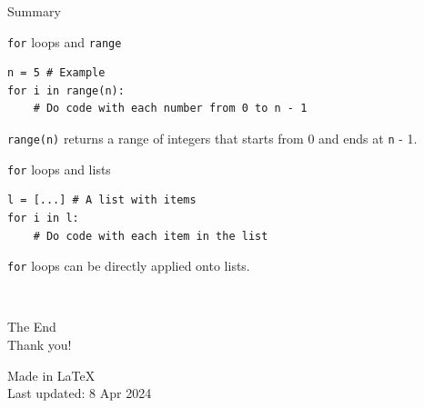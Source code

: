 \documentclass[dvipsnames, svgnames, x11names]{beamer}
\begin{document}
\begin{frame}[fragile]{Summary}
\begin{block}{\texttt{for} loops and \texttt{range}}
\begin{verbatim}
n = 5 # Example
for i in range(n):
    # Do code with each number from 0 to n - 1
\end{verbatim}
\texttt{range(n)} returns a range of integers that starts from 0 and ends at \texttt{n} - 1.
\end{block}

\begin{block}{\texttt{for} loops and lists}
\begin{verbatim}
l = [...] # A list with items
for i in l:
    # Do code with each item in the list
\end{verbatim}
\texttt{for} loops can be directly applied onto lists.
\end{block}
\end{frame}

\begin{frame}{ \ }
	\begin{center}
		The End\\
		Thank you!

        Made in \LaTeX\\
		Last updated: 8 Apr 2024
	\end{center}
\end{frame}


















\end{document}
